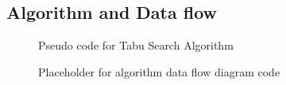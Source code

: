 \subsection{Algorithm and Data flow}
\begin{figure}[h]
	\centering
	\setlength \fboxsep{0pt}
	\setlength \fboxrule{0.5pt}
	\caption{Pseudo code for Tabu Search Algorithm}
	\label{fig:SAAlgorithmPseudoCode}
\end{figure}
\begin{figure}[htbp!]
	\centering
	\setlength \fboxsep{0pt}
	\setlength \fboxrule{0.5pt}
	\caption{Placeholder for algorithm data flow diagram code}
	\label{fig:SAFlowDiagram}
\end{figure}
